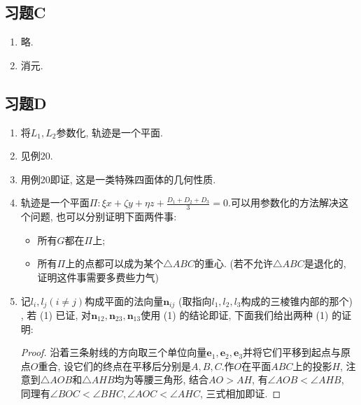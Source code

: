 \documentclass[./main.tex]{subfiles}
\begin{document}
\subsection*{习题C}
\begin{enumerate}
    \item 略.
    \item 消元.
\end{enumerate}

\subsection*{习题D}
\begin{enumerate}
    \item 将$L_1,L_2$参数化, 轨迹是一个平面.
    \item 见例20.
    \item 用例20即证, 这是一类特殊四面体的几何性质.
    \item 轨迹是一个平面$\Pi:\xi x+\zeta y+\eta z+\frac{D_1+D_2+D_3}{3}=0$.可以用参数化的方法解决这个问题, 也可以分别证明下面两件事: 
        \begin{itemize}
            \item 所有$G$都在$\Pi$上; 
            \item 所有$\Pi$上的点都可以成为某个$\triangle ABC$的重心. (若不允许$\triangle ABC$是退化的, 证明这件事需要多费些力气) 
        \end{itemize}
    \item 记$l_i,l_j(i\neq j)$构成平面的法向量$\mathbf{n}_{ij}$ (取指向$l_1,l_2,l_3$构成的三棱锥内部的那个) , 若 (1) 已证, 对$\mathbf{n}_{12},\mathbf{n}_{23},\mathbf{n}_{13}$使用 (1) 的结论即证, 下面我们给出两种 (1) 的证明: 
        \begin{proof} 沿着三条射线的方向取三个单位向量$\mathbf{e}_1,\mathbf{e}_2,\mathbf{e}_3$并将它们平移到起点与原点$O$重合, 设它们的终点在平移后分别是$A,B,C$.作$O$在平面$ABC$上的投影$H$, 注意到$\triangle AOB$和$\triangle AHB$均为等腰三角形, 结合$AO>AH$, 有$\angle AOB<\angle AHB$, 同理有$\angle BOC<\angle BHC,\angle AOC<\angle AHC$, 三式相加即证.\end{proof}

\end{enumerate}
\end{document}
